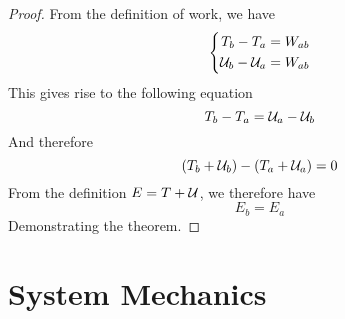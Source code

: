 \documentclass[../admech.tex]{subfiles}
\begin{document}
\begin{proof}
	From the definition of work, we have
	\begin{equation*}
		\left\{\begin{aligned}
			T_b-T_a&=W_{ab}\\
			\mathcal{U}_b-\mathcal{U}_a&=W_{ab}
		\end{aligned}\right.
	\end{equation*}
	This gives rise to the following equation
	\begin{equation*}
		T_b-T_a=\mathcal{U}_a-\mathcal{U}_b
	\end{equation*}
	And therefore
	\begin{equation*}
		(T_b+\mathcal{U}_b)-(T_a+\mathcal{U}_a)=0
	\end{equation*}
	From the definition $E=T+\mathcal{U}$, we therefore have
	\begin{equation*}
		E_b=E_a
	\end{equation*}
	Demonstrating the theorem.
\end{proof}
\section{System Mechanics}
\end{document}
